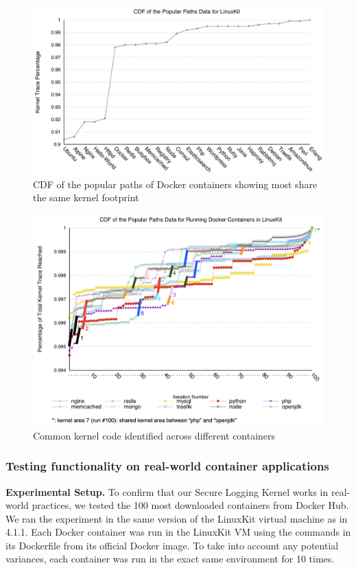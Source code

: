 \begin{figure}
\centering
\includegraphics[width=1.5\columnwidth]{diagram/pp-cdf.png}
\caption{\small CDF of the popular paths of Docker containers showing most share the same kernel footprint}
\label{fig:pp-cdf}
\end{figure}

\begin{figure}
\centering
\includegraphics[width=1.5\columnwidth]{diagram/cdf-marked.png}
\caption{\small Common kernel code identified across different containers}
\label{fig:cdf-marked}
\end{figure}

\subsubsection{Testing functionality on real-world container applications}
\label{sec.evaluation.functionality.containers} 
\textbf{Experimental Setup.}
To confirm that our Secure Logging Kernel works in real-world practices, we tested the 100 most downloaded containers from Docker Hub. 
We ran the experiment in the same version of the LinuxKit virtual machine as in 4.1.1. 
Each Docker container was run in the LinuxKit VM using the commands in its Dockerfile from its official Docker image. 
To take into account any potential variances, each container was run in the exact same environment for 10 times. 

